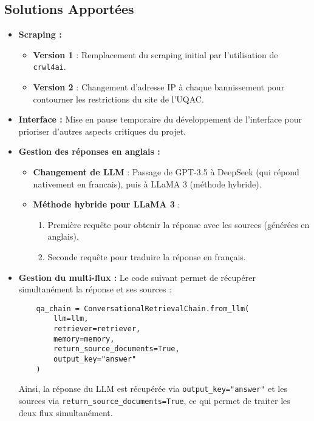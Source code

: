 \documentclass{article}
\begin{document}
\subsection{Solutions Apportées}

\begin{itemize}
    \item \textbf{Scraping :} 
    \begin{itemize}
        \item \textbf{Version 1} : Remplacement du scraping initial par l'utilisation de \texttt{crwl4ai}.
        \item \textbf{Version 2} : Changement d'adresse IP à chaque bannissement pour contourner les restrictions du site de l'UQAC.
    \end{itemize}
    
    \item \textbf{Interface :} Mise en pause temporaire du développement de l'interface pour prioriser d'autres aspects critiques du projet.
    
    \item \textbf{Gestion des réponses en anglais :} 
    \begin{itemize}
        \item \textbf{Changement de LLM} : Passage de GPT-3.5 à DeepSeek (qui répond nativement en francais), puis à LLaMA 3 (méthode hybride).
        \item \textbf{Méthode hybride pour LLaMA 3} :  
        \begin{enumerate}
            \item Première requête pour obtenir la réponse avec les sources (générées en anglais).
            \item Seconde requête pour traduire la réponse en français.
        \end{enumerate}
    \end{itemize}

    \item \textbf{Gestion du multi-flux :}  
    Le code suivant permet de récupérer simultanément la réponse et ses sources :
    
    \begin{verbatim}
    qa_chain = ConversationalRetrievalChain.from_llm(
        llm=llm,
        retriever=retriever,
        memory=memory,
        return_source_documents=True,
        output_key="answer"
    )
    \end{verbatim}

    Ainsi, la réponse du LLM est récupérée via \texttt{output\_key="answer"} et les sources via \texttt{return\_source\_documents=True}, ce qui permet de traiter les deux flux simultanément.


\end{itemize}
\end{document}
